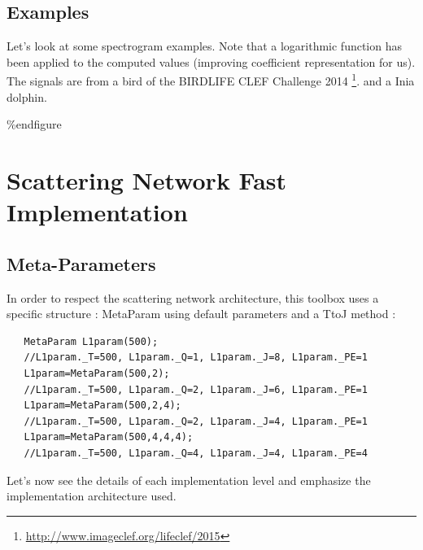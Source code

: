 \documentclass[a4paper]{report}
\begin{document}
\section{Examples}
Let's look at some spectrogram examples. Note that a logarithmic function has been applied to the computed values (improving coefficient representation for us).
The signals are from a bird of the BIRDLIFE CLEF Challenge 2014 \footnote{\url{http://www.imageclef.org/lifeclef/2015}}.
 and a Inia dolphin.

\%end{figure}



\chapter{Scattering Network Fast Implementation}
\section{Meta-Parameters}
In order to respect the scattering network architecture, this toolbox uses a specific structure : MetaParam using default parameters and a TtoJ method :

\begin{lstlisting}
   MetaParam L1param(500);
   //L1param._T=500, L1param._Q=1, L1param._J=8, L1param._PE=1
   L1param=MetaParam(500,2);
   //L1param._T=500, L1param._Q=2, L1param._J=6, L1param._PE=1
   L1param=MetaParam(500,2,4);
   //L1param._T=500, L1param._Q=2, L1param._J=4, L1param._PE=1
   L1param=MetaParam(500,4,4,4);
   //L1param._T=500, L1param._Q=4, L1param._J=4, L1param._PE=4
\end{lstlisting}

Let's now see the details of each implementation level and emphasize the implementation architecture used.
\end{document}
